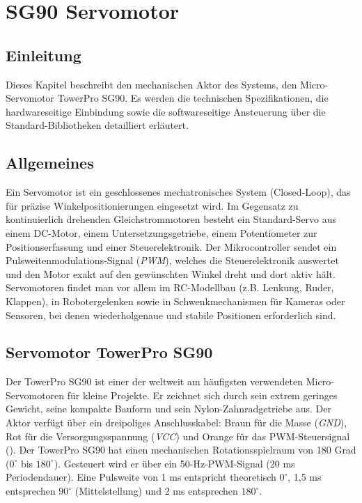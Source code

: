 %
%

\chapter{SG90 Servomotor}

\section*{Einleitung}
Dieses Kapitel beschreibt den mechanischen Aktor des Systems, den Micro-Servomotor TowerPro SG90. Es werden die technischen Spezifikationen, die hardwareseitige Einbindung sowie die softwareseitige Ansteuerung über die Standard-Bibliotheken detailliert erläutert.


\section{Allgemeines}
Ein Servomotor ist ein geschlossenes mechatronisches System (Closed-Loop), das für präzise Winkelpositionierungen eingesetzt wird. Im Gegensatz zu kontinuierlich drehenden Gleichstrommotoren besteht ein Standard-Servo aus einem DC-Motor, einem Untersetzungsgetriebe, einem Potentiometer zur Positionserfassung und einer Steuerelektronik. Der Mikrocontroller sendet ein Pulsweitenmodulations-Signal (\textit{PWM}), welches die Steuerelektronik auswertet und den Motor exakt auf den gewünschten Winkel dreht und dort aktiv hält. Servomotoren findet man vor allem im RC-Modellbau (z.B. Lenkung, Ruder, Klappen), in Robotergelenken sowie in Schwenkmechanismen für Kameras oder Sensoren, bei denen wiederholgenaue und stabile Positionen erforderlich sind.\cite{SparkFun:2026}

\section{Servomotor TowerPro SG90}
Der TowerPro SG90 ist einer der weltweit am häufigsten verwendeten Micro-Servomotoren für kleine Projekte. Er zeichnet sich durch sein extrem geringes Gewicht, seine kompakte Bauform und sein Nylon-Zahnradgetriebe aus. Der Aktor verfügt über ein dreipoliges Anschlusskabel: Braun für die Masse (\textit{GND}), Rot für die Versorgungsspannung (\textit{VCC}) und Orange für das PWM-Steuersignal (). Der TowerPro SG90 hat einen mechanischen Rotationsspielraum von 180 Grad ($0^\circ$ bis $180^\circ$). Gesteuert wird er über ein 50-Hz-PWM-Signal (20 ms Periodendauer). Eine Pulsweite von 1 ms entspricht theoretisch $0^\circ$, 1,5 ms entsprechen $90^\circ$ (Mittelstellung) und 2 ms entsprechen $180^\circ$.\cite{Elektronik:2026,Components101:2026}  

